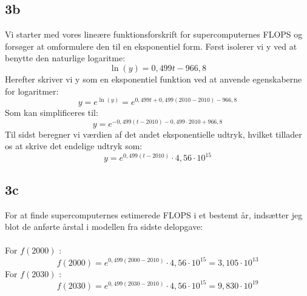 \documentclass{article}
\begin{document}
\subsection*{3b}
Vi starter med vores lineære funktionsforskrift for supercomputernes FLOPS og forsøger at omformulere den til en eksponentiel form. Først isolerer vi y ved at benytte den naturlige logaritme:
$$
\ln (y)=0,499 t-966,8
$$
Herefter skriver vi y som en eksponentiel funktion ved at anvende egenskaberne for logaritmer:
$$
y=e^{\ln (y)}=e^{0,499 t+0,499(2010-2010)-966,8}
$$
Som kan simplificeres til:
$$
y=e^{-0,499(t-2010)-0,499 \cdot 2010+966,8}
$$
Til sidst beregner vi værdien af det andet eksponentielle udtryk, hvilket tillader os at skrive det endelige udtryk som:
$$
y=e^{0,499(t-2010)} \cdot 4,56 \cdot 10^{15}
$$
\subsection*{3c}
For at finde supercomputernes estimerede FLOPS i et bestemt år, indsætter jeg blot de anførte årstal i modellen fra sidste delopgave:
\\
\\
For $f(2000)$ :
$$
f(2000)=e^{0,499(2000-2010)} \cdot 4,56 \cdot 10^{15}=3,105 \cdot 10^{13}
$$
For $f(2030)$ :
$$
f(2030)=e^{0,499(2030-2010)} \cdot 4,56 \cdot 10^{15}=9,830 \cdot 10^{19}
$$
\end{document}

